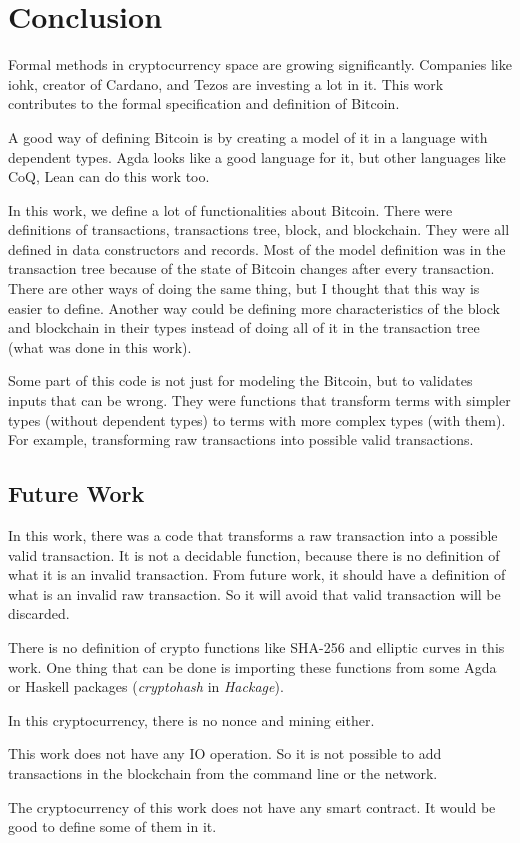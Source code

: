 \section{Conclusion}

Formal methods in cryptocurrency space are growing significantly.
Companies like \gls{iohk}, creator of Cardano, and Tezos are investing a lot in it.
This work contributes to the formal specification and definition of Bitcoin.

A good way of defining Bitcoin is by creating a model of it in a language with dependent types.
Agda looks like a good language for it, but other languages like CoQ, Lean can do this work too.

In this work, we define a lot of functionalities about Bitcoin.
There were definitions of transactions, transactions tree, block, and blockchain.
They were all defined in data constructors and records.
Most of the model definition was in the transaction tree
because of the state of Bitcoin changes after every transaction.
There are other ways of doing the same thing,
but I thought that this way is easier to define.
Another way could be defining more characteristics of the block and blockchain in their
types instead of doing all of it in the transaction tree (what was done in this work).

Some part of this code is not just for modeling the Bitcoin,
but to validates inputs that can be wrong.
They were functions that transform terms with simpler types (without dependent types)
to terms with more complex types (with them).
For example, transforming raw transactions into possible valid transactions.

\subsection{Future Work}

In this work, there was a code that transforms a raw transaction into a possible valid transaction.
It is not a decidable function, because there is no definition of what it is an invalid transaction.
From future work, it should have a definition of what is an invalid raw transaction.
So it will avoid that valid transaction will be discarded. 

There is no definition of crypto functions like SHA-256 and elliptic curves in this work.
One thing that can be done is importing these functions from some Agda or Haskell packages
(\emph{cryptohash} in \emph{Hackage}).

In this cryptocurrency, there is no nonce and mining either.

This work does not have any IO operation.
So it is not possible to add transactions in the blockchain from the command line or the network.

The cryptocurrency of this work does not have any smart contract.
It would be good to define some of them in it.
